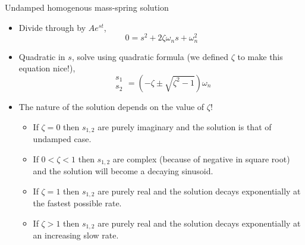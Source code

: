 \documentclass[11pt,aspectratio=169,handout]{beamer}
\begin{document}
\begin{frame}[c]{Undamped homogenous mass-spring solution}
	\begin{itemize}
		\item<1-> Divide through by $Ae^{st}$,
			\begin{equation}\label{}
			0 = s^2  +2\zeta\omega_n s  + \omega_n^2 
		\end{equation}
		\item<2-> Quadratic in $s$, solve using quadratic formula (we defined $\zeta$ to make this equation nice!),
		\begin{equation}
			\begin{array}{c} 
				s_1 \\
				s_2\end{array} = \left(-\zeta \pm \sqrt{\zeta^2-1}\right)\omega_n
		\end{equation}
	\item<3-> The nature of the solution depends on the value of $\zeta$!
	\begin{itemize}
		\item[-] If $\zeta=0$ then $s_{1,2}$ are purely imaginary and the solution is that of undamped case.
		\item[-] If $0<\zeta<1$ then $s_{1,2}$ are complex (because of negative in square root) and the solution will become a decaying sinusoid.
		\item[-] If $\zeta=1$ then $s_{1,2}$ are purely real and the solution decays exponentially at the fastest possible rate. 
		\item[-] If $\zeta>1$ then $s_{1,2}$ are purely real and the solution decays exponentially at an increasing slow rate. 
	\end{itemize}
	\end{itemize}
\end{frame}
\end{document}
